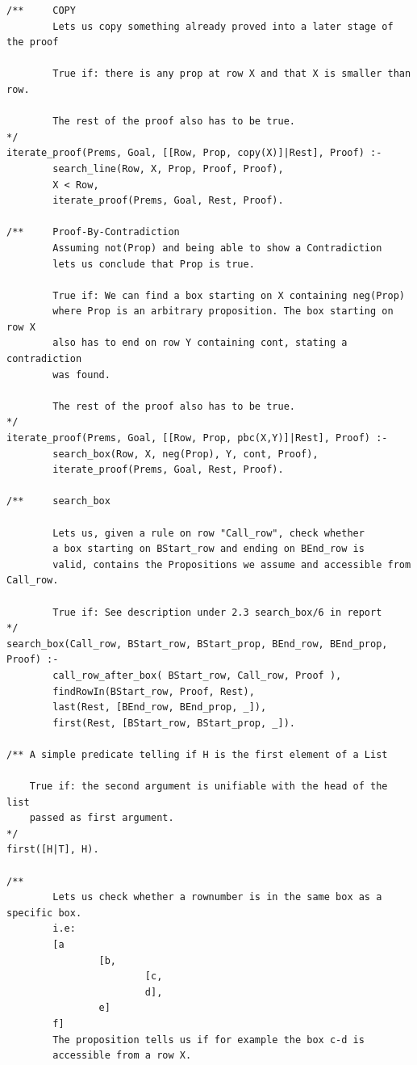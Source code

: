 \documentclass[a4paper]{article}
\begin{document}
\begin{verbatim}
/**     COPY
        Lets us copy something already proved into a later stage of the proof
        
        True if: there is any prop at row X and that X is smaller than row.
        
        The rest of the proof also has to be true.
*/
iterate_proof(Prems, Goal, [[Row, Prop, copy(X)]|Rest], Proof) :-
        search_line(Row, X, Prop, Proof, Proof),
        X < Row,
        iterate_proof(Prems, Goal, Rest, Proof).

/**     Proof-By-Contradiction
        Assuming not(Prop) and being able to show a Contradiction
        lets us conclude that Prop is true.
        
        True if: We can find a box starting on X containing neg(Prop) 
        where Prop is an arbitrary proposition. The box starting on row X
        also has to end on row Y containing cont, stating a contradiction
        was found.
        
        The rest of the proof also has to be true.
*/
iterate_proof(Prems, Goal, [[Row, Prop, pbc(X,Y)]|Rest], Proof) :-
        search_box(Row, X, neg(Prop), Y, cont, Proof),
        iterate_proof(Prems, Goal, Rest, Proof).

/**     search_box

        Lets us, given a rule on row "Call_row", check whether
        a box starting on BStart_row and ending on BEnd_row is
        valid, contains the Propositions we assume and accessible from Call_row.
        
        True if: See description under 2.3 search_box/6 in report
*/
search_box(Call_row, BStart_row, BStart_prop, BEnd_row, BEnd_prop, Proof) :-
        call_row_after_box( BStart_row, Call_row, Proof ),
        findRowIn(BStart_row, Proof, Rest),
        last(Rest, [BEnd_row, BEnd_prop, _]),
        first(Rest, [BStart_row, BStart_prop, _]).

/** A simple predicate telling if H is the first element of a List 
	
	True if: the second argument is unifiable with the head of the list 
	passed as first argument.
*/
first([H|T], H).

/**
        Lets us check whether a rownumber is in the same box as a specific box.
        i.e:
        [a
                [b,
                        [c,
                        d],
                e]
        f]
        The proposition tells us if for example the box c-d is 
        accessible from a row X. 
        

\end{verbatim}
\end{document}
